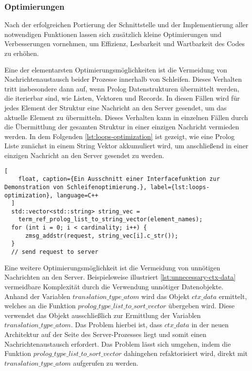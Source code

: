 \subsubsection{Optimierungen}
\label{subsec:optimizations}
Nach der erfolgreichen Portierung der Schnittstelle und der Implementierung aller notwendigen Funktionen
lassen sich zusätzlich kleine Optimierungen und Verbesserungen vornehmen, um Effizienz, Lesbarkeit und Wartbarkeit des Codes zu erhöhen.

Eine der elementarsten Optimierungsmöglichkeiten ist die Vermeidung von Nachrichtenaustausch beider Prozesse
innerhalb von Schleifen. Dieses Verhalten tritt insbesondere dann auf, wenn Prolog Datenstrukturen übermittelt werden,
die iterierbar sind, wie Listen, Vektoren und Records.
In diesen Fällen wird für jedes Element der Struktur eine Nachricht an den Server gesendet,
um das aktuelle Element zu übermitteln.
Dieses Verhalten kann in einzelnen Fällen durch die Übermittlung der gesamten Struktur in einer einzigen Nachricht vermieden werden.
In dem Folgenden \cref{lst:loops-optimization} ist gezeigt, wie eine Prolog Liste zunächst in einem String Vektor akkumuliert wird,
um anschließend in einer einzigen Nachricht an den Server gesendet zu werden.

\begin{lstlisting}[
    float, caption={Ein Ausschnitt einer Interfacefunktion zur Demonstration von Schleifenoptimierung.}, label={lst:loops-optimization}, language=C++
  ]
  std::vector<std::string> string_vec = 
    term_ref_prolog_list_to_string_vector(element_names);
  for (int i = 0; i < cardinality; i++) {
      zmsg_addstr(request, string_vec[i].c_str());
  }
  // send request to server
\end{lstlisting}
Eine weitere Optimierungsmöglichkeit ist die Vermeidung von unnötigen Nachrichten an den Server.
Beispielsweise illustriert \cref{lst:unnecessary-ctx-data} vermeidbare Komplexität durch die Verwendung unnötiger Datenobjekte.
Anhand der Variablen $translation\_type\_atom$ wird das Objekt $ctx\_data$ ermittelt, welches an die Funktion $prolog\_type\_list\_to\_sort\_vector$ übergeben wird.
Diese verwendet das Objekt ausschließlich zur Ermittlung der Variablen $translation\_type\_atom$. Das Problem hierbei ist,
dass $ctx\_data$ in der neuen Architektur auf der Seite des Server-Prozesses liegt und somit einen Nachrichtenaustausch erfordert.
Das Problem lässt sich umgehen, indem die Funktion $prolog\_type\_list\_to\_sort\_vector$ dahingehen refaktorisiert wird,
direkt mit $translation\_type\_atom$ aufgerufen zu werden.


